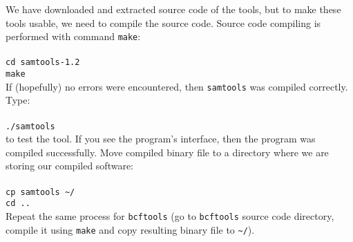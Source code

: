 We have downloaded and extracted source code of the tools, but to make
these tools usable, we need to compile the source code. Source code compiling
is performed with command \texttt{make}:\\~\\
\texttt{cd samtools-1.2}\\
\texttt{make}\\

If (hopefully) no errors were encountered, then \texttt{samtools} was compiled correctly. Type:\\~\\
\texttt{./samtools}\\

to test the tool. If you see the program's interface, then the program was compiled successfully.
Move compiled binary file to a directory where we are storing our compiled software:\\~\\
\texttt{cp samtools \textasciitilde/\binDir}\\
\texttt{cd ..}\\

Repeat the same process for \texttt{bcftools}
(go to \texttt{bcftools} source code directory,
compile it using \texttt{make} and copy resulting binary file to \texttt{\textasciitilde/\binDir}).
